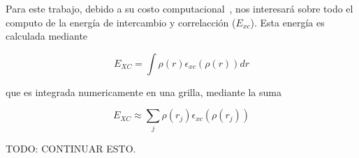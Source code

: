 Para este trabajo, debido a su costo computacional~\cite{PaperNitscheManu}, nos interesar\'a sobre todo el computo de la energ\'ia de intercambio y correlacci\'on ($E_{xc}$).
Esta energ\'ia es calculada mediante 

\begin{equation}
    E_{XC} = \int \rho(r) \epsilon_{xc}(\rho(r)) dr
\end{equation}

que es integrada numericamente en una grilla, mediante la suma

\begin{equation}
    E_{XC} \approx \sum_j \rho(r_j) \epsilon_{xc} (\rho(r_j))
\end{equation}

TODO: CONTINUAR ESTO.
